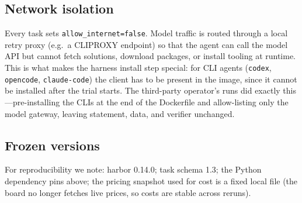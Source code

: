 \subsection{Network isolation}
Every task sets \texttt{allow\_internet=false}. Model traffic is routed through a local retry proxy (e.g.\ a CLIPROXY endpoint) so that the agent can call the model API but cannot fetch solutions, download packages, or install tooling at runtime. This is what makes the harness install step special: for CLI agents (\texttt{codex}, \texttt{opencode}, \texttt{claude-code}) the client has to be present in the image, since it cannot be installed after the trial starts. The third-party operator's runs did exactly this---pre-installing the CLIs at the end of the Dockerfile and allow-listing only the model gateway, leaving statement, data, and verifier unchanged.

\subsection{Frozen versions}
For reproducibility we note: harbor 0.14.0; task schema 1.3; the Python dependency pins above; the pricing snapshot used for cost is a fixed local file (the board no longer fetches live prices, so costs are stable across reruns).
